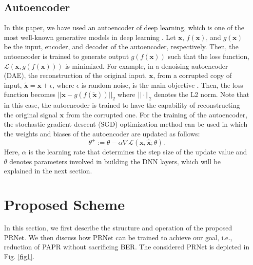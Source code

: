 \documentclass[journal]{IEEEtran}
\begin{document}
\subsection{Autoencoder}
In this paper, we have used an autoencoder of deep learning, which is one of the most well-known generative models in deep learning \cite{b12}. Let $\boldsymbol{x}$, $f(\boldsymbol{x})$, and $g(\boldsymbol{x})$ be the input, encoder, and decoder of the autoencoder, respectively. Then, the autoencoder is trained to generate output $g(f(\boldsymbol{x}))$ such that the loss function, $\mathcal{L}(\boldsymbol{x}, g(f(\boldsymbol{x})))$ is minimized. For example, in a denoising autoencoder (DAE), the reconstruction of the original input, $\boldsymbol{x}$, from a corrupted copy of input, $\tilde{\boldsymbol{x}} = \boldsymbol{x} + \epsilon$, where $\epsilon$ is random noise, is the main objective \cite{b12}. Then, the loss function becomes $||\boldsymbol{x} - g(f(\tilde{\boldsymbol{x}}))||_2$ where $||\cdot||_2$ denotes the L2 norm. Note that in this case, the autoencoder is trained to have the capability of reconstructing the original signal $\boldsymbol{x}$ from the corrupted one. For the training of the autoencoder, the stochastic gradient descent (SGD) optimization method can be used in which the weights and biases of the autoencoder are updated as follows:
\begin{equation}
\theta^+ := \theta - \alpha \nabla \mathcal{L}(\boldsymbol{x}, \hat{\boldsymbol{x}}; \theta) .
\label{eq3}
\end{equation}
Here, $\alpha$ is the learning rate that determines the step size of the update value and $\theta$ denotes parameters involved in building the DNN layers, which will be explained in the next section.

\section{Proposed Scheme}
In this section, we first describe the structure and operation of the proposed PRNet. We then discuss how PRNet can be trained to achieve our goal, i.e., reduction of PAPR without sacrificing BER. The considered PRNet is depicted in Fig. \ref{fig1}.
\end{document}
